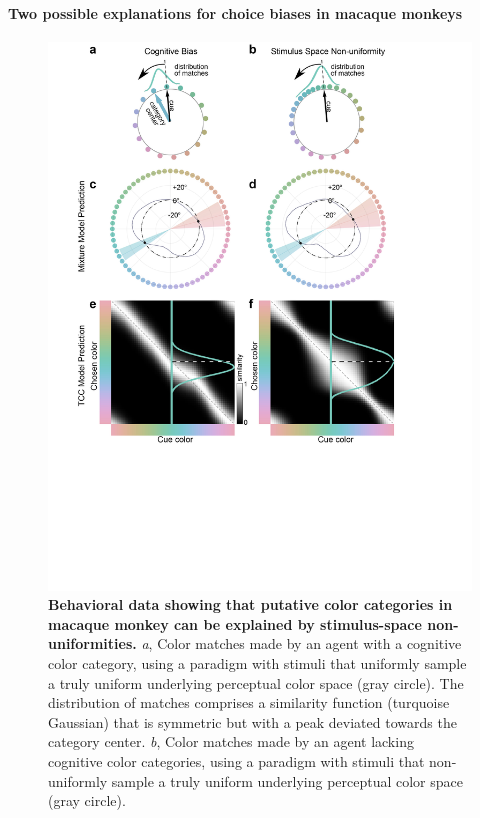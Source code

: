 \paragraph{Two possible explanations for choice biases in macaque monkeys}

\begin{figure}
    \begin{fullwidth}
    \centering
    \includegraphics[width=\textwidth+4cm,trim={0 7cm 0 0},clip]{../Figures/flat/F3_TCCModel_6.jpg}
    \caption{\textbf{Behavioral data showing that putative color categories in macaque monkey can be explained by stimulus-space non-uniformities.} \emph{a}, Color matches made by an agent with a cognitive color category, using a paradigm with stimuli that uniformly sample a truly uniform underlying perceptual color space (gray circle). 
	The distribution of matches comprises a similarity function (turquoise Gaussian) that is symmetric but with a peak deviated towards the category center. 
	\emph{b}, Color matches made by an agent lacking cognitive color categories, using a paradigm with stimuli that non-uniformly sample a truly uniform underlying perceptual color space (gray circle). 
}
\end{fullwidth}
\end{figure}
